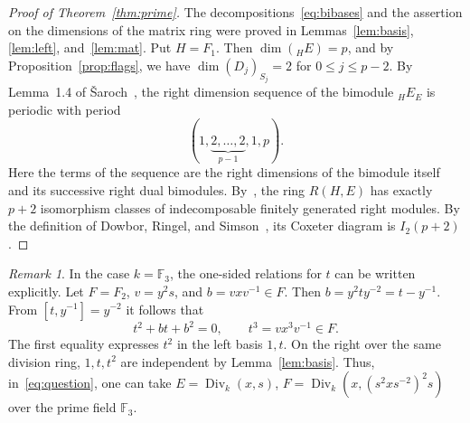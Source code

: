 \documentclass[11pt,a4paper,reqno]{amsart}
\numberwithin{equation}{section}
\theoremstyle{remark}
\newtheorem{remark}[theorem]{Remark}
\newcommand{\Div}{\operatorname{Div}_k}
\begin{document}
\begin{proof}[Proof of Theorem~\ref{thm:prime}]
The decompositions~\eqref{eq:bibases} and the assertion on the dimensions of the matrix ring
were proved in Lemmas~\ref{lem:basis}, \ref{lem:left}, and~\ref{lem:mat}.
Put $H=F_1$. Then $\dim({}_H E)=p$, and by
Proposition~\ref{prop:flags}, we have $\dim (D_j)_{S_j}=2$ for
$0\le j\le p-2$. By Lemma~1.4 of \v{S}aroch~\cite{Sar}, the right
dimension sequence of the bimodule $ {}_H E_E$ is periodic with period
\[
 (1,\underbrace{2,\ldots,2}_{p-1},1,p).
\]
Here the terms of the sequence are the right dimensions of the
bimodule itself and its successive right dual bimodules.
By~\cite[Lemma~1.3]{Sar}, the ring $R(H,E)$ has exactly $p+2$
isomorphism classes of indecomposable finitely generated right modules.
By the definition of Dowbor, Ringel, and Simson~\cite[\S\,3]{DRS}, its
Coxeter diagram is \mbox{$I_2(p+2)$}.
\end{proof}

\begin{remark}\label{rem:three}
In the case $k=\mathbb F_3$, the one-sided relations for $t$ can
be written explicitly. Let $F=F_2$, $v=y^2s$, and $b=v x v^{-1}\in F$.
Then $b=y^2t y^{-2}=t-y^{-1}$. From $[t,y^{-1}]=y^{-2}$ it follows that
\[
 t^2+b t+b^2=0,\qquad t^3=v x^3 v^{-1}\in F .
\]
The first equality expresses $t^2$ in the left basis $1,t$.
On the right over the same division ring, $1,t,t^2$ are independent by Lemma~\ref{lem:basis}.
Thus, in~\eqref{eq:question}, one can take
$E=\Div(x,s)$, $F=\Div(x,(s^2xs^{-2})^2s)$ over the prime field
$\mathbb F_3$.
\end{remark}
\end{document}

